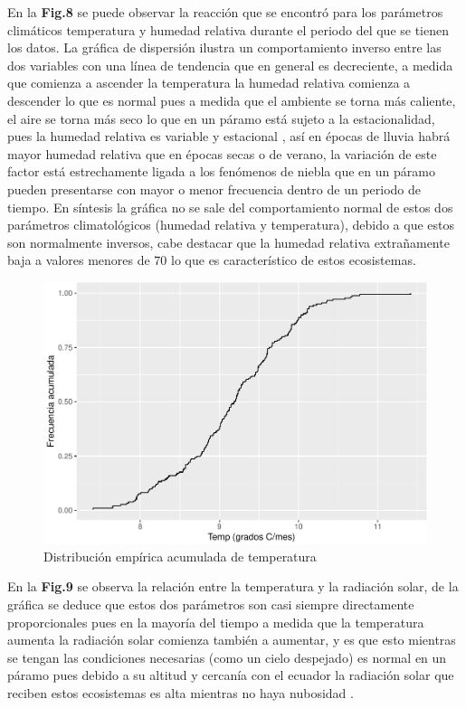 \documentclass[conference,final,]{IEEEtran}
\makeatletter
\def\maxwidth{\ifdim\Gin@nat@width>\linewidth\linewidth
\else\Gin@nat@width\fi}
\let\Oldincludegraphics\includegraphics
\renewcommand{\includegraphics}[1]{\Oldincludegraphics[width=\maxwidth]{#1}}
\makeatother
\begin{document}
En la \textbf{Fig.8} se puede observar la reacción que se encontró para
los parámetros climáticos temperatura y humedad relativa durante el
periodo del que se tienen los datos. La gráfica de dispersión ilustra un
comportamiento inverso entre las dos variables con una línea de
tendencia que en general es decreciente, a medida que comienza a
ascender la temperatura la humedad relativa comienza a descender lo que
es normal pues a medida que el ambiente se torna más caliente, el aire
se torna más seco lo que en un páramo está sujeto a la estacionalidad,
pues la humedad relativa es variable y estacional \cite{hofstede2017p},
así en épocas de lluvia habrá mayor humedad relativa que en épocas secas
o de verano, la variación de este factor está estrechamente ligada a los
fenómenos de niebla que en un páramo pueden presentarse con mayor o
menor frecuencia dentro de un periodo de tiempo. En síntesis la gráfica
no se sale del comportamiento normal de estos dos parámetros
climatológicos (humedad relativa y temperatura), debido a que estos son
normalmente inversos, cabe destacar que la humedad relativa extrañamente
baja a valores menores de 70 lo que es característico de estos
ecosistemas. \cite{hofstede2017p}

\begin{figure}
\centering
\includegraphics{Hidrology_files/figure-latex/unnamed-chunk-23-1.pdf}
\caption{Distribución empírica acumulada de temperatura}
\end{figure}

En la \textbf{Fig.9} se observa la relación entre la temperatura y la
radiación solar, de la gráfica se deduce que estos dos parámetros son
casi siempre directamente proporcionales pues en la mayoría del tiempo a
medida que la temperatura aumenta la radiación solar comienza también a
aumentar, y es que esto mientras se tengan las condiciones necesarias
(como un cielo despejado) es normal en un páramo pues debido a su
altitud y cercanía con el ecuador la radiación solar que reciben estos
ecosistemas es alta mientras no haya nubosidad
\cite{montenegro2015estimacion}.
\end{document}
